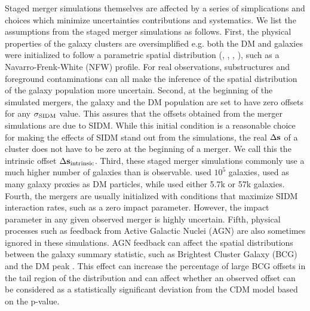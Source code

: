 \documentclass[usenatbib]{mn2e}
\newcommand{\sigmaSIDM}{\sigma_{\rm SIDM}}
\newcommand{\offset}{\Delta {\bf s}}
\begin{document}
Staged merger simulations themselves are affected by a series of simplications and choices which minimize uncertainties contributions and systematics. We list the assumptions from the staged merger simulations as follows. First, the physical properties of the galaxy clusters are oversimplified e.g. both the DM and 
galaxies were initialized to follow a parametric spatial 
distribution   
(\citealt{Randall2008d}, \citealt{Kahlhoefer14}, \citealt{Robertson2016}, \citealt{Kim:2016}), 
such as a Navarro-Frenk-White (NFW) profile. For real observations,
substructures and foreground
contaminations can all make the inference of the spatial distribution 
of the galaxy population more uncertain. 
Second, at the beginning of the simulated mergers, the galaxy and the DM
population are set to have zero offsets for any $\sigmaSIDM$ value. 
This assures that the offsets obtained from the merger simulations are due to SIDM. 
While this initial condition 
is a reasonable choice for making the effects of SIDM stand out from the simulations, 
the real $\offset$ of a cluster does not have to be zero at the 
beginning of a merger. We call this the intrinsic offset $\offset_{\rm
intrinsic}$.
Third, these staged merger simulations commonly use a much higher number of 
galaxies than is observable. \cite{Randall2008d} used
$10^5$ galaxies, \cite{Kahlhoefer14} used as many galaxy proxies as DM particles, 
while \cite{Kim:2016} used either 5.7k or 57k galaxies. 
Fourth, the mergers are usually initialized with conditions that maximize SIDM
interaction rates, such as a zero impact parameter. However, the impact
parameter in any given observed merger is highly uncertain. 
Fifth, physical processes such as feedback from Active
Galactic Nuclei (AGN) are also sometimes ignored in these simulations. 
AGN feedback can affect the spatial distributions between the galaxy summary
statistic, such as  Brightest Cluster
Galaxy (BCG) and  
the DM peak \citep{Cui2015}. This effect can increase the percentage of large 
BCG offsets in the tail region of the distribution and can affect whether an observed offset can be 
considered as a statistically significant deviation from the CDM model based on the p-value. 
\end{document}
